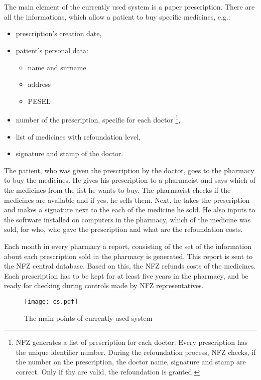 \chapter{   }

The main element of the currently used system is a paper prescription. There are all the informations, which allow a patient to buy specific medicines, e.g.: 

\begin{itemize}
  \item prescription’s creation date,
  \item patient’s personal data:
  \begin{itemize}
	  \item name and surname
	  \item address
	  \item PESEL
  \end{itemize}
  \item number of the prescription, specific for each doctor \footnote{NFZ generates a list of prescription for each doctor. Every prescription has the unique identifier number. During the refoundation process, NFZ checks, if the number on the prescription, the doctor name, signature and stamp are correct. Only if thy are valid, the refoundation is granted.  },
  \item list of medicines with refoundation level,
  \item signature and stamp of the doctor. 
\end{itemize}

The patient, who was given the prescription by the doctor, goes to the pharmacy to buy the medicines. He gives his prescription to a pharmacist and says which of the medicines from the list he wants to buy. The pharmacist checks if the medicines are available and if yes, he sells them. Next, he takes the prescription and makes a signature next to the each of the medicine he sold. He also inputs to the software installed on computers in the pharmacy, which of the medicine was sold, for who, who gave the prescription and what are the refoundation costs.

Each month in every pharmacy a report, consisting of  the set of the information about each prescription sold in the pharmacy is generated. This report is sent to the NFZ central database. Based on this, the NFZ refunds costs of the medicines. Each prescription has to be kept for at least five years in the pharmacy, and be ready for checking during controls made by NFZ representatives. 

\begin{figure}	
	\hspace*{0.8in}
    \texttt{[image: cs.pdf]}
    \caption{The main points of currently used system}
    \label{fig:mp_cs}
\end{figure} 
